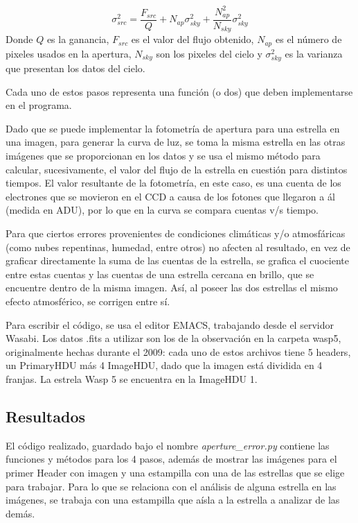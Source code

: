 \documentclass[a4paper, 11pt, spanish]{article}
\begin{document}
\begin{itemize}
	\begin{equation*}
	\sigma_{src}^2 = \frac{F_{src}}{Q} + N_{ap}\sigma_{sky}^2 + \frac{N_{ap}^2}{N_{sky}}\sigma_{sky}^2
	\end{equation*}
	Donde $Q$ es la ganancia, $F_{src}$ es el valor del flujo obtenido, $N_{ap}$ es el n\'umero de pixeles usados en la apertura, $N_{sky}$ son los pixeles del cielo y $\sigma_{sky}^2$ es la varianza que presentan los datos del cielo.
	
\end{itemize}

Cada uno de estos pasos representa una funci\'on (o dos) que deben implementarse en el programa.

Dado que se puede implementar la fotometr\'ia de apertura para una estrella en una imagen, para generar la curva de luz, se toma la misma estrella en las otras im\'agenes que se proporcionan en los datos y se usa el mismo m\'etodo para calcular, sucesivamente, el valor del flujo de la estrella en cuesti\'on para distintos tiempos. El valor resultante de la fotometr\'ia, en este caso, es una cuenta de los electrones que se movieron en el CCD a causa de los fotones que llegaron a \'al (medida en ADU), por lo que en la curva se compara cuentas v/s tiempo. 

Para que ciertos errores provenientes de condiciones clim\'aticas y/o atmosf\'aricas (como nubes repentinas, humedad, entre otros) no afecten al resultado, en vez de graficar directamente la suma de las cuentas de la estrella, se grafica el cuociente entre estas cuentas y las cuentas de una estrella cercana en brillo, que se encuentre dentro de la misma imagen. As\'i, al poseer las dos estrellas el mismo efecto atmosf\'erico, se corrigen entre s\'i.

Para escribir el c\'odigo, se usa el editor EMACS, trabajando desde el servidor Wasabi. Los datos .fits a utilizar son los de la observaci\'on en la carpeta wasp5, originalmente hechas durante el 2009: cada uno de estos archivos tiene 5 headers, un PrimaryHDU m\'as 4 ImageHDU, dado que la imagen est\'a dividida en 4 franjas. La estrela Wasp 5 se encuentra en la ImageHDU 1. 


\subsection{Resultados}

El c\'odigo realizado, guardado bajo el nombre  \textit{aperture\_error.py} contiene las funciones y m\'etodos para los 4 pasos, adem\'as de mostrar las im\'agenes para el primer Header con imagen y una estampilla con una de las estrellas que se elige para trabajar. Para lo que se relaciona con el an\'alisis de alguna estrella en las im\'agenes, se trabaja con una estampilla que a\'isla a la estrella a analizar de las dem\'as.
\end{document}
